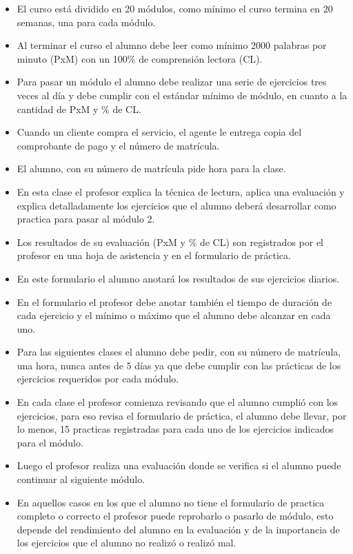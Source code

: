 \documentclass{templateApunte}
\begin{document}
\begin{itemize}
  \item El curso está dividido en 20 módulos, como mínimo el curso termina en 20 semanas, una para cada módulo.
  \item Al terminar el curso el alumno debe leer como  mínimo 2000 palabras por minuto (PxM) con un 100\% de comprensión lectora (CL).
  \item Para pasar un módulo el alumno debe realizar una serie de ejercicios tres veces al día y debe cumplir con el estándar mínimo de módulo, en cuanto a la cantidad de PxM y \% de CL.
  \item Cuando un cliente compra el servicio, el agente le entrega copia del comprobante de pago y el número de matrícula.
  \item El alumno, con su número de matrícula pide hora para la clase.
  \item En esta clase el profesor explica la técnica de lectura, aplica una evaluación y explica detalladamente los ejercicios que el alumno deberá desarrollar como practica para pasar al módulo 2.
  \item Los resultados de su evaluación (PxM y \% de CL) son registrados por el profesor en una hoja de asistencia y en el formulario de práctica.
  \item En este formulario el alumno anotará los resultados de sus ejercicios diarios.
  \item En el formulario el profesor debe anotar también el tiempo de duración de cada ejercicio y el mínimo o máximo que el alumno debe alcanzar en cada uno.
  \item Para las siguientes clases el alumno debe pedir, con su número de matrícula, una hora, nunca antes de 5 días ya que debe cumplir con las prácticas de los ejercicios requeridos por cada módulo.
  \item En cada clase el profesor comienza revisando que el alumno cumplió con los ejercicios, para eso revisa el formulario de práctica, el alumno debe llevar, por lo menos, 15 practicas registradas para cada uno de los ejercicios indicados para el módulo.
  \item Luego el profesor realiza una evaluación donde se verifica si el alumno puede continuar al siguiente módulo.
  \item En aquellos casos en los que el alumno no tiene el formulario de practica completo o correcto el profesor puede reprobarlo o pasarlo de módulo, esto depende del rendimiento del alumno en la evaluación y de la importancia de los ejercicios que el alumno no realizó o realizó mal.

\end{itemize}
\end{document}
